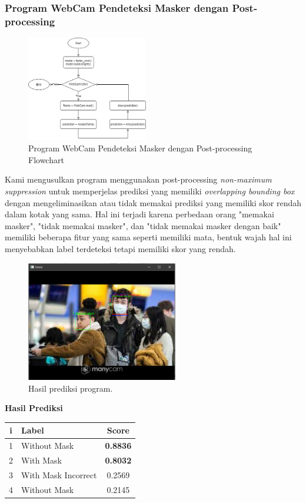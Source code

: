 \documentclass{article}
\begin{document}
  	\subsubsection{Program WebCam Pendeteksi Masker dengan Post-processing}
  	\begin{figure}[H]
  		\centering
  		\includegraphics[width=200px]{arsitektur/Sequential with Postprocessing.png}
  		\caption{Program WebCam Pendeteksi Masker dengan Post-processing Flowchart}
	\end{figure}
	
	Kami mengusulkan program menggunakan post-processing \textit{non-maximum suppression} \cite{nms_pytorch} untuk memperjelas prediksi yang memiliki \textit{overlapping bounding box} dengan mengeliminasikan atau tidak memakai prediksi yang memiliki skor rendah dalam kotak yang sama. Hal ini terjadi karena perbedaan orang "memakai masker", "tidak memakai masker", dan "tidak memakai masker dengan baik" memiliki beberapa fitur yang sama seperti memiliki mata, bentuk wajah hal ini menyebabkan label terdeteksi tetapi memiliki skor yang rendah.\\

	\begin{figure}[H]
		\centering
		\includegraphics[width=250px]{../demo/Results/implementation/raw_prediction_nms0_labeled.png}
		\caption{Hasil prediksi program.}
	\end{figure}
	{\large{\textbf{Hasil Prediksi}}}
	\begin{table}[H]
		\centering
		\begin{tabular}{clc}
		\hline
		\textbf{i} & \textbf{Label}               & \textbf{Score}  \\ \hline
		1 & Without Mask        & \textbf{0.8836} \\
		2 & With Mask           & \textbf{0.8032} \\
		3 & With Mask Incorrect & 0.2569 \\
		4 & Without Mask        & 0.2145
		\end{tabular}
	\end{table}
	\newpage
	
\end{document}
